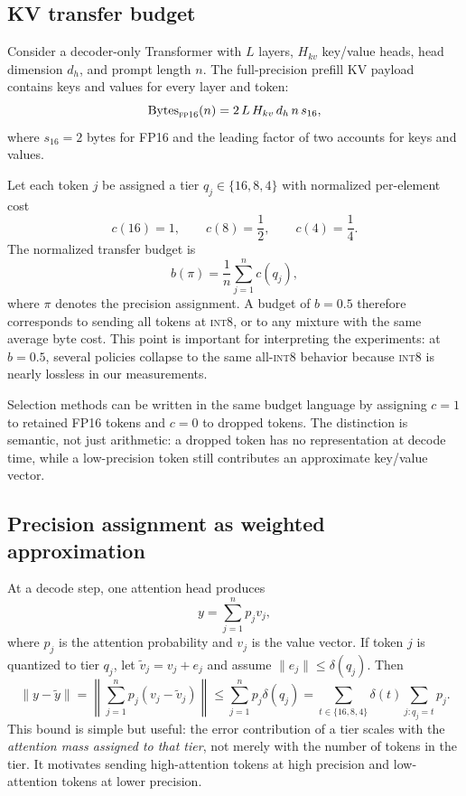 \documentclass[11pt]{article}
\newcommand{\budget}{b}
\newcommand{\fp}{\textsc{fp16}}
\newcommand{\intviii}{\textsc{int8}}
\theoremstyle{plain}
\theoremstyle{definition}
\begin{document}
\subsection{KV transfer budget}
Consider a decoder-only Transformer with $L$ layers, $H_{kv}$ key/value heads, head dimension $d_h$, and prompt length $n$.  The full-precision prefill KV payload contains keys and values for every layer and token:
\begin{equation}
  \mathrm{Bytes}_{\fp{}}(n)= 2\,L\,H_{kv}\,d_h\,n\,s_{16},
  \label{eq:fullbytes}
\end{equation}
where $s_{16}=2$ bytes for FP16 and the leading factor of two accounts for keys and values.

Let each token $j$ be assigned a tier $q_j\in\{16,8,4\}$ with normalized per-element cost
\begin{equation}
 c(16)=1,\qquad c(8)=\frac{1}{2},\qquad c(4)=\frac{1}{4}.
\end{equation}
The normalized transfer budget is
\begin{equation}
  \budget(\pi)=\frac{1}{n}\sum_{j=1}^n c(q_j),
  \label{eq:budget}
\end{equation}
where $\pi$ denotes the precision assignment.  A budget of $\budget=0.5$ therefore corresponds to sending all tokens at \intviii{}, or to any mixture with the same average byte cost.  This point is important for interpreting the experiments: at $\budget=0.5$, several policies collapse to the same all-\intviii{} behavior because \intviii{} is nearly lossless in our measurements.

Selection methods can be written in the same budget language by assigning $c=1$ to retained FP16 tokens and $c=0$ to dropped tokens.  The distinction is semantic, not just arithmetic: a dropped token has no representation at decode time, while a low-precision token still contributes an approximate key/value vector.

\subsection{Precision assignment as weighted approximation}
At a decode step, one attention head produces
\begin{equation}
  y = \sum_{j=1}^{n} p_j v_j,
  \label{eq:attention-output}
\end{equation}
where $p_j$ is the attention probability and $v_j$ is the value vector.  If token $j$ is quantized to tier $q_j$, let $\tilde v_j=v_j+e_j$ and assume $\|e_j\|\le \delta(q_j)$.  Then
\begin{equation}
  \|y-\tilde y\|
  =\left\|\sum_{j=1}^{n}p_j(v_j-\tilde v_j)\right\|
  \le \sum_{j=1}^{n}p_j\delta(q_j)
  =\sum_{t\in\{16,8,4\}} \delta(t)\sum_{j:q_j=t}p_j .
  \label{eq:quant-bound}
\end{equation}
This bound is simple but useful: the error contribution of a tier scales with the \emph{attention mass assigned to that tier}, not merely with the number of tokens in the tier.  It motivates sending high-attention tokens at high precision and low-attention tokens at lower precision.
\end{document}

